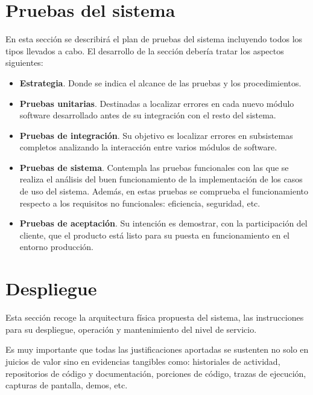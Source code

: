 \section{Pruebas del sistema}
En esta sección se describirá el plan de pruebas del sistema incluyendo todos los tipos llevados a cabo. El desarrollo de la sección debería tratar los aspectos siguientes:
\begin{itemize}[noitemsep]
\item \textbf{Estrategia}. Donde se indica el alcance de las pruebas y los procedimientos.

\item \textbf{Pruebas unitarias}. Destinadas a localizar errores en cada nuevo módulo software desarrollado antes de su integración con el resto del sistema.

\item \textbf{Pruebas de integración}. Su objetivo es localizar errores en subsistemas completos analizando la interacción entre varios módulos de software.

\item \textbf{Pruebas de sistema}. Contempla las pruebas funcionales con las que se realiza el análisis del buen funcionamiento de la implementación de los casos de uso del sistema. Además, en estas pruebas se comprueba el funcionamiento respecto a los requisitos no funcionales: eficiencia, seguridad, etc.

\item \textbf{Pruebas de aceptación}. Su intención es demostrar, con la participación del cliente, que el producto está listo para su puesta en funcionamiento en el entorno producción.
\end{itemize}

\section{Despliegue}
Esta sección recoge la arquitectura física propuesta del sistema, las instrucciones para su despliegue, operación y mantenimiento del
nivel de servicio.

Es muy importante que todas las justificaciones aportadas se sustenten no solo en juicios de valor sino en evidencias tangibles como: historiales de actividad, repositorios de código y documentación, porciones de código, trazas de ejecución, capturas de pantalla, demos, etc.
